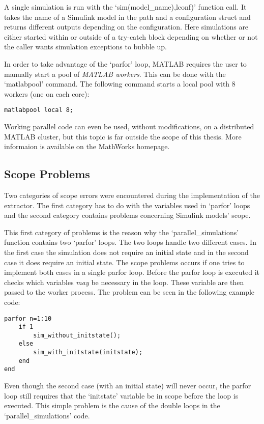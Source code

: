A single simulation is run with the `sim(model\_name),lconf)' function call. It takes the name of a Simulink model in the path and a configuration struct and returns different outputs depending on the configuration. Here simulations are either started within or outside of a try-catch block depending on whether or not the caller wants simulation exceptions to bubble up.

In order to take advantage of the `parfor' loop, MATLAB requires the user to manually start a pool of \textit{MATLAB workers}. This can be done with the `matlabpool' command. The following command starts a local pool with 8 workers (one on each core):

\begin{lstlisting}
matlabpool local 8;
\end{lstlisting}

Working parallel code can even be used, without modifications, on a distributed MATLAB cluster, but this topic is far outside the scope of this thesis. More informaion is available on the MathWorks homepage.


\subsection{Scope Problems}

Two categories of scope errors were encountered during the implementation of the extractor. The first category has to do with the variables used in `parfor' loops and the second category contains problems concerning Simulink models' scope.

This first category of problems is the reason why the `parallel\_simulations' function contains two `parfor' loops. The two loops handle two different cases. In the first case the simulation does not require an initial state and in the second case it does require an initial state. The scope problems occurs if one tries to implement both cases in a single parfor loop. Before the parfor loop is executed it checks which variables \textit{may} be necessary in the loop. These variable are then passed to the worker process. The problem can be seen in the following example code:

\begin{lstlisting}
parfor n=1:10
    if 1
        sim_without_initstate();
    else
        sim_with_initstate(initstate);
    end
end
\end{lstlisting}

Even though the second case (with an initial state) will never occur, the parfor loop still requires that the `initstate' variable be in scope before the loop is executed. This simple problem is the cause of the double loops in the `parallel\_simulations' code.

